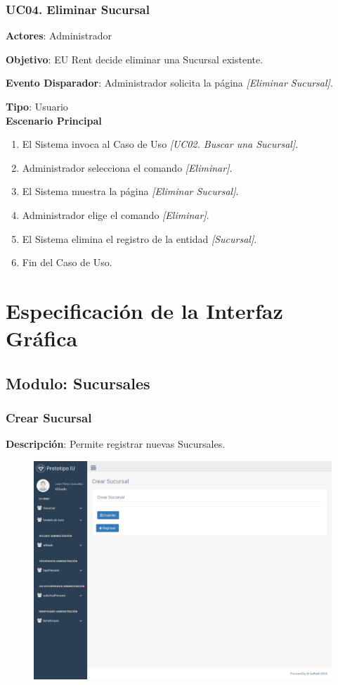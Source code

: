 \documentclass[10pt, letterpaper]{report}
\begin{document}
\subsection{UC04. Eliminar Sucursal} \label{EliminarSucursal}
\textbf{Actores}: Administrador

\textbf{Objetivo}: EU Rent decide eliminar una Sucursal existente.

\textbf{Evento Disparador}: Administrador solicita la página \textit{[Eliminar Sucursal]}.

\textbf{Tipo}: Usuario\\

\textbf{Escenario Principal}

\begin{enumerate}
\item El Sistema invoca al Caso de Uso \textit{[UC02. Buscar una Sucursal]}.
\item Administrador selecciona el comando \textit{[Eliminar]}.
\item El Sistema muestra la página \textit{[Eliminar Sucursal]}.
\item Administrador elige el comando \textit{[Eliminar]}.
\item El Sistema elimina el registro de la entidad \textit{[Sucursal]}.
\item Fin del Caso de Uso.
\end{enumerate}


\chapter{Especificación de la Interfaz Gráfica}

\section{Modulo: Sucursales}

\subsection{Crear Sucursal}
\textbf{Descripción}: Permite registrar nuevas Sucursales.\\
\begin{figure}[h]
	\includegraphics[width=\linewidth]{ui-prototype/SucursalServices/CrearSucursalPage.png}
\end{figure}
\end{document}
